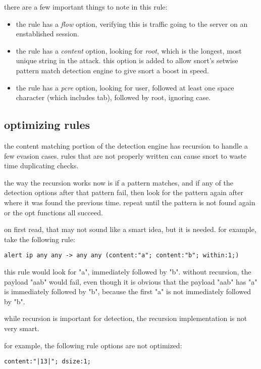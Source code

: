 \documentclass[english]{report}
\begin{document}
there are a few important things to note in this rule:
\begin{itemize}
\item the rule has a \emph{flow} option, verifying this is traffic going to the server on an enstablished session.
\item the rule has a \emph{content} option, looking for \emph{root}, which is
the longest, most unique string in the attack.  this option is added to allow
snort's setwise pattern match detection engine to give snort a boost in speed.
\item the rule has a \emph{pcre} option, looking for user, followed at least one space character (which includes tab), followed by root, ignoring case.
\end{itemize}

\subsection{optimizing rules}

the content matching portion of the detection engine has recursion to handle a
few evasion cases.  rules that are not properly written can cause snort to
waste time duplicating checks.

the way the recursion works now is if a pattern matches, and if any of the
detection options after that pattern fail, then look for the pattern again
after where it was found the previous time.  repeat until the pattern is not
found again or the opt functions all succeed.

on first read, that may not sound like a smart idea, but it is needed.  for example, take the following rule:

\begin{verbatim}
alert ip any any -> any any (content:"a"; content:"b"; within:1;)
\end{verbatim}

this rule would look for "a", immediately followed by "b".  without recursion,
the payload "aab" would fail, even though it is obvious that the payload "aab"
has "a" is immediately followed by "b", because the first "a" is not
immediately followed by "b".

while recursion is important for detection, the recursion implementation is not
very smart.

for example, the following rule options are not optimized:
\begin{verbatim}
content:"|13|"; dsize:1;
\end{verbatim}
\end{document}
